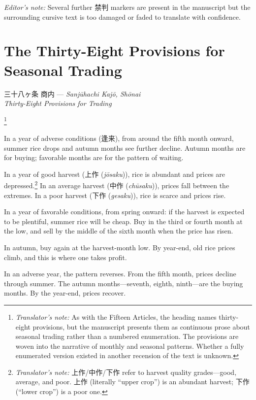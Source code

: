 \documentclass[10pt, openany]{book}
\newcommand{\jp}[1]{{\japanesefont #1}}
\newcommand{\tn}[1]{\footnote{\textit{Translator's note:} #1}}
\newcommand{\jt}[2]{\jp{#1} (\textit{#2})}
\newenvironment{editorialnote}{%
  \begin{editorbox}\small\textit{Editor's note:}\enspace}{\end{editorbox}}
\begin{document}
\begin{editorialnote}
Several further \jp{禁判} markers are present in the manuscript but the
surrounding cursive text is too damaged or faded to translate with
confidence.
\end{editorialnote}

\section{The Thirty-Eight Provisions for Seasonal Trading}

\begin{center}
\jp{三十八ヶ条 商内} --- \textit{Sanj\=uhachi Kaj\=o, Sh\=onai}\\
\textit{Thirty-Eight Provisions for Trading}
\end{center}

\vspace{0.5em}

\tn{As with the Fifteen Articles, the heading names thirty-eight provisions,
but the manuscript presents them as continuous prose about seasonal trading
rather than a numbered enumeration. The provisions are woven into the
narrative of monthly and seasonal patterns. Whether a fully enumerated
version existed in another recension of the text is unknown.}

In a year of adverse conditions (\jp{逢来}), from around the fifth month
onward, summer rice drops and autumn months see further decline. Autumn
months are for buying; favorable months are for the pattern of waiting.

In a year of good harvest (\jt{上作}{j\=osaku}), rice is abundant and
prices are depressed.\tn{\jp{上作}/\jp{中作}/\jp{下作} refer to harvest
quality grades---good, average, and poor.
\jp{上作} (literally ``upper crop'') is an abundant harvest; \jp{下作}
(``lower crop'') is a poor one.} In an average harvest
(\jt{中作}{ch\=usaku}), prices fall between the extremes. In a poor
harvest (\jt{下作}{gesaku}), rice is scarce and prices rise.

In a year of favorable conditions, from spring onward: if the harvest is
expected to be plentiful, summer rice will be cheap. Buy in the third or
fourth month at the low, and sell by the middle of the sixth month when the
price has risen.

In autumn, buy again at the harvest-month low. By year-end, old rice prices
climb, and this is where one takes profit.

In an adverse year, the pattern reverses. From the fifth month, prices
decline through summer. The autumn months---seventh, eighth, ninth---are
the buying months. By the year-end, prices recover.
\end{document}
